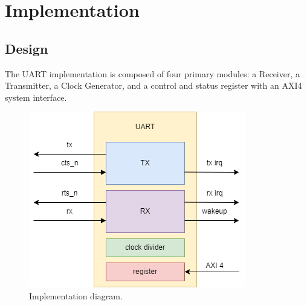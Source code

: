 \documentclass[12pt]{article}
\begin{document}
\section{Implementation}
\subsection{Design}
The UART implementation is composed of four primary modules: a Receiver, 
a Transmitter, a Clock Generator, and a control and status register with an 
AXI4 system interface.
\begin{figure}[h]
  \centering
  \includegraphics[scale=0.6]{UART_IMPL_DIAGRAM.png}
  \caption{Implementation diagram.}
\end{figure}
\end{document}
